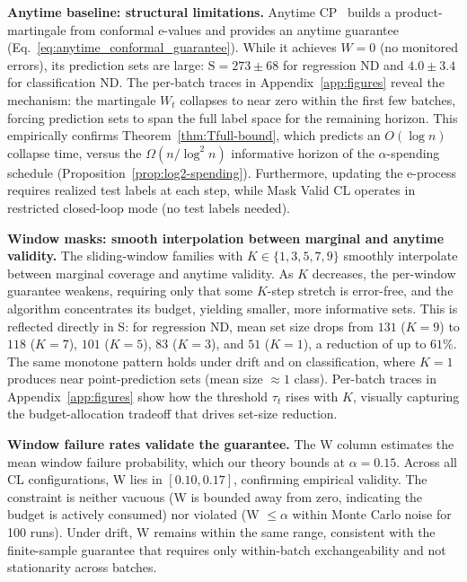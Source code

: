 \documentclass{uai2026} %
\newcommand{\1}{\mathbf{1}}
\begin{document}

\textbf{Anytime baseline: structural limitations.}
Anytime CP~\citep{gauthier2025values} builds a product-martingale from conformal e-values and provides an anytime guarantee (Eq.~\ref{eq:anytime_conformal_guarantee}).
While it achieves $W{=}0$ (no monitored errors), its prediction sets are large: $\mathrm{S}{=}273{\pm}68$ for regression ND and $4.0{\pm}3.4$ for classification ND.
The per-batch traces in Appendix~\ref{app:figures} reveal the mechanism: the martingale $W_t$ collapses to near zero within the first few batches, forcing prediction sets to span the full label space for the remaining horizon.
This empirically confirms Theorem~\ref{thm:Tfull-bound}, which predicts an $O(\log n)$ collapse time, versus the $\Omega(n/\log^2 n)$ informative horizon of the $\alpha$-spending schedule (Proposition~\ref{prop:log2-spending}).
Furthermore, updating the e-process requires realized test labels at each step, while Mask Valid CL operates in restricted closed-loop mode (no test labels needed).

\textbf{Window masks: smooth interpolation between marginal and anytime validity.}
The sliding-window families with $K \in \{1, 3, 5, 7, 9\}$ smoothly interpolate between marginal coverage and anytime validity.
As $K$ decreases, the per-window guarantee weakens, requiring only that some $K$-step stretch is error-free, and the algorithm concentrates its budget, yielding smaller, more informative sets.
This is reflected directly in S: for regression ND, mean set size drops from $131$ ($K{=}9$) to $118$ ($K{=}7$), $101$ ($K{=}5$), $83$ ($K{=}3$), and $51$ ($K{=}1$), a reduction of up to $61\%$.
The same monotone pattern holds under drift and on classification, where $K{=}1$ produces near point-prediction sets (mean size ${\approx}1$ class).
Per-batch traces in Appendix~\ref{app:figures} show how the threshold $\tau_t$ rises with $K$, visually capturing the budget-allocation tradeoff that drives set-size reduction.

\textbf{Window failure rates validate the guarantee.}
The W column estimates the mean window failure probability, which our theory bounds at $\alpha{=}0.15$.
Across all CL configurations, W lies in $[0.10, 0.17]$, confirming empirical validity.
The constraint is neither vacuous (W is bounded away from zero, indicating the budget is actively consumed) nor violated (W $\le \alpha$ within Monte Carlo noise for 100 runs).
Under drift, W remains within the same range, consistent with the finite-sample guarantee that requires only within-batch exchangeability and not stationarity across batches.
\end{document}
